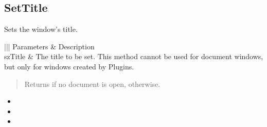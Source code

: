 \documentclass[letterpaper,12pt,english,openany,oneside]{sphinxmanual}
\begin{document}
\subsection{SetTitle}
\label{\detokenize{IAC_API_OLE_Objects:settitle}}
Sets the window’s title.


\begin{sphinxVerbatim}[commandchars=\\\{\}]
  
\end{sphinxVerbatim}
\label{\detokenize{IAC_API_OLE_Objects:parameters-31}}


\begin{savenotes}\sphinxattablestart
\centering
{}\label{\detokenize{IAC_API_OLE_Objects:section-34}}\nobreak
\begin{tabular}[t]{|||}
\hline
\sphinxstyletheadfamily 
Parameters
&\sphinxstyletheadfamily 
Description
\\
\hline
szTitle
&
The title to be set. This method cannot be used for document windows, but only for windows created by Plugins.
\\
\hline
\end{tabular}
\par
\sphinxattableend\end{savenotes}

\begin{quote}

Returns  if no document is open,  otherwise.
\end{quote}
\label{\detokenize{IAC_API_OLE_Objects:related-methods-46}}
\begin{itemize}
\item {} 
 

\item {} 
 

\item {} 
 

\end{itemize}
\end{document}
